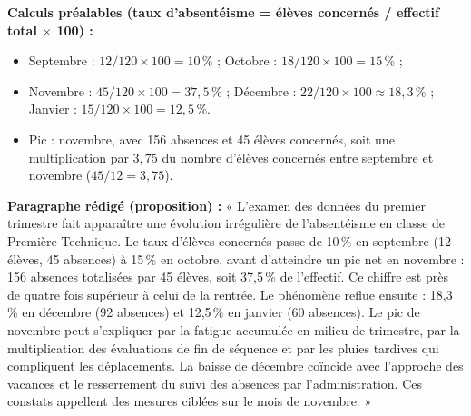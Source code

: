 \documentclass[11pt]{article}
\begin{document}
\begin{corrige}
\textbf{Calculs préalables (taux d'absentéisme = élèves concernés / effectif total $\times$ 100) :}
\begin{itemize}
    \item Septembre : $12/120 \times 100 = 10\,\%$ ; Octobre : $18/120 \times 100 = 15\,\%$ ;
    \item Novembre : $45/120 \times 100 = 37,5\,\%$ ; Décembre : $22/120 \times 100 \approx 18,3\,\%$ ; Janvier : $15/120 \times 100 = 12,5\,\%$.
    \item Pic : novembre, avec 156 absences et 45 élèves concernés, soit une multiplication par $3,75$ du nombre d'élèves concernés entre septembre et novembre ($45/12 = 3,75$).
\end{itemize}
\textbf{Paragraphe rédigé (proposition) :}
« L'examen des données du premier trimestre fait apparaître une évolution irrégulière de l'absentéisme en classe de Première Technique. Le taux d'élèves concernés passe de 10\,\% en septembre (12 élèves, 45 absences) à 15\,\% en octobre, avant d'atteindre un pic net en novembre : 156 absences totalisées par 45 élèves, soit 37,5\,\% de l'effectif. Ce chiffre est près de quatre fois supérieur à celui de la rentrée. Le phénomène reflue ensuite : 18,3\,\% en décembre (92 absences) et 12,5\,\% en janvier (60 absences). Le pic de novembre peut s'expliquer par la fatigue accumulée en milieu de trimestre, par la multiplication des évaluations de fin de séquence et par les pluies tardives qui compliquent les déplacements. La baisse de décembre coïncide avec l'approche des vacances et le resserrement du suivi des absences par l'administration. Ces constats appellent des mesures ciblées sur le mois de novembre. »
\end{corrige}
\end{document}
